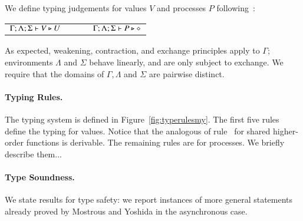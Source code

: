 \noindent We define typing judgements for values $V$ and processes $P$ following~\cite{tlca07}:
\begin{center}
	\begin{tabular}{c}
	 $\Gamma; \Lambda; \Sigma \vdash V \triangleright U \qquad \qquad \Gamma; \Lambda; \Sigma \vdash P \triangleright \diamond$
	\end{tabular}
\end{center}
As expected, weakening, contraction, and exchange principles apply to $\Gamma$;
environments $\Lambda$ and $\Sigma$ behave linearly, and are only subject to exchange.
We require that the domains of $\Gamma, \Lambda$ and $\Sigma$ are pairwise distinct.

\paragraph{Typing Rules.}
The typing system is defined in Figure~\ref{fig:typerulesmy}. 
The first five rules define the typing for values. Notice that the analogous of rule~
for shared higher-order functions is derivable.
The remaining rules are for processes. We briefly describe them...



\paragraph{Type Soundness.}
We state results for type safety:
we report instances of more general statements already proved by Mostrous and Yoshida in the asynchronous case.

